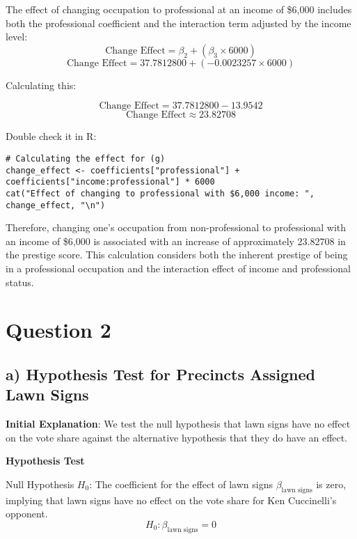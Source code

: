 \documentclass[12pt]{article}
\begin{document}
The effect of changing occupation to professional at an income of \$6,000 includes both the professional coefficient and the interaction term adjusted by the income level:
\begin{equation}
    \text{Change Effect} = \beta_2 + (\beta_3 \times 6000)
\end{equation}
\begin{equation}
    \text{Change Effect} = 37.7812800 + (-0.0023257 \times 6000)
\end{equation}

Calculating this:

\begin{equation}
    \text{Change Effect} = 37.7812800 - 13.9542
\end{equation}
\begin{equation}
    \text{Change Effect} \approx 23.82708
\end{equation}

Double check it in R:
\begin{lstlisting}
# Calculating the effect for (g)
change_effect <- coefficients["professional"] + coefficients["income:professional"] * 6000
cat("Effect of changing to professional with $6,000 income: ", change_effect, "\n")
\end{lstlisting}

Therefore, changing one's occupation from non-professional to professional with an income of \$6,000 is associated with an increase of approximately 23.82708 in the prestige score. This calculation considers both the inherent prestige of being in a professional occupation and the interaction effect of income and professional status.


\section{Question 2}
\subsection*{a) Hypothesis Test for Precincts Assigned Lawn Signs}
\textbf{Initial Explanation}: We test the null hypothesis that lawn signs have no effect on the vote share against the alternative hypothesis that they do have an effect.


\textbf{Hypothesis Test}

Null Hypothesis \( H_0 \): The coefficient for the effect of lawn signs \( \beta_{\text{lawn signs}} \) is zero, implying that lawn signs have no effect on the vote share for Ken Cuccinelli's opponent.
\[ H_0: \beta_{\text{lawn signs}} = 0 \]
\end{document}
